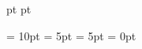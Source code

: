  pt
 pt





\usepackage[font={small,sf},labelfont=bf]{caption} %
\renewcommand\floatpagefraction{.8}
\renewcommand\topfraction{.8}
\renewcommand\bottomfraction{.8}
\renewcommand\textfraction{.2}
\floatsep = 10pt  		%
\abovecaptionskip = 5pt 	%
\belowcaptionskip = 5pt	%
\dbltextfloatsep = 0pt 	%




\newcommand{\Line}[0]{
\vspace{-20pt}    %
\rule{0pt}{0pt}\hrule\rule{0pt}{0pt}
}


\newcommand{\SkipSection}[2]{
	\ifnum #1 = 1
	\else 
		#2
	\fi
}


